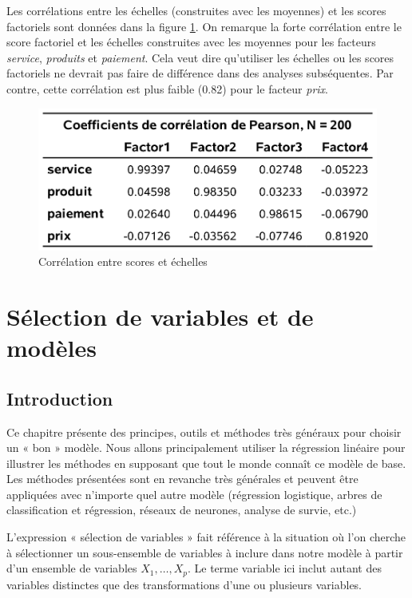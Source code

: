 \documentclass[
]{book}
\theoremstyle{definition}
\theoremstyle{definition}
\theoremstyle{definition}
\theoremstyle{remark}
\begin{document}
Les corrélations entre les échelles (construites avec les moyennes) et les scores factoriels sont données dans la figure \ref{fig:fig1p16}. On remarque la forte corrélation entre le score factoriel et les échelles construites avec les moyennes pour les facteurs \emph{service}, \emph{produits} et \emph{paiement}. Cela veut dire qu'utiliser les échelles ou les scores factoriels ne devrait pas faire de différence dans des analyses subséquentes. Par contre, cette corrélation est plus faible (0.82) pour le facteur \emph{prix}.

\begin{figure}

{\centering \includegraphics[width=0.65\linewidth]{figures/01-facto-e16} 

}

\caption{Corrélation entre scores et échelles}\label{fig:fig1p16}
\end{figure}

\hypertarget{suxe9lection-de-variables-et-de-moduxe8les-1}{%
\chapter{Sélection de variables et de modèles}\label{suxe9lection-de-variables-et-de-moduxe8les-1}}

\hypertarget{introduction-2}{%
\section{Introduction}\label{introduction-2}}

Ce chapitre présente des principes, outils et méthodes très généraux pour choisir un « bon » modèle. Nous allons principalement utiliser la régression linéaire pour illustrer les méthodes en supposant que tout le monde connaît ce modèle de base. Les méthodes présentées sont en revanche très générales et peuvent être appliquées avec n'importe quel autre modèle (régression logistique, arbres de classification et régression, réseaux de neurones, analyse de survie, etc.)

L'expression « sélection de variables » fait référence à la situation où l'on cherche à sélectionner un sous-ensemble de variables à inclure dans notre modèle à partir d'un ensemble de variables \(X_1, \ldots, X_p\). Le terme variable ici inclut autant des variables distinctes que des transformations d'une ou plusieurs variables.
\end{document}
